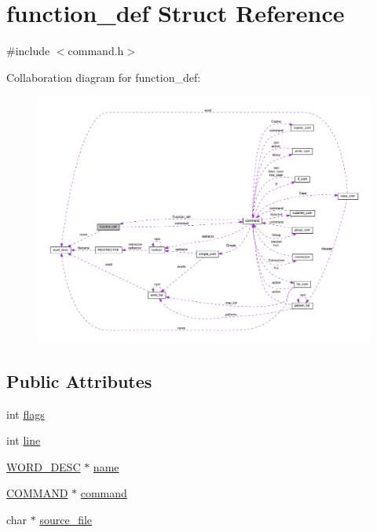 \hypertarget{structfunction__def}{}\section{function\+\_\+def Struct Reference}
\label{structfunction__def}


{\ttfamily \#include $<$command.\+h$>$}



Collaboration diagram for function\+\_\+def\+:
\nopagebreak
\begin{figure}[H]
\begin{center}
\leavevmode
\includegraphics[width=350pt]{structfunction__def__coll__graph}
\end{center}
\end{figure}
\subsection*{Public Attributes}
\begin{DoxyCompactItemize}
\item 
int \hyperlink{structfunction__def_a6301401481265ca9b5282b683b2ba2d4}{flags}
\item 
int \hyperlink{structfunction__def_a522bca5d5ecc615cff04e01de1d19ffc}{line}
\item 
\hyperlink{command_8h_a3f0cccf333703e5f6c4168be0db675fa}{W\+O\+R\+D\+\_\+\+D\+E\+SC} $\ast$ \hyperlink{structfunction__def_a0015166324aa0e5e336c97afcec63059}{name}
\item 
\hyperlink{command_8h_a8c41dec142c299806885773c902c0d87}{C\+O\+M\+M\+A\+ND} $\ast$ \hyperlink{structfunction__def_a1d47a692dd8fb660368206a3218f3fe8}{command}
\item 
char $\ast$ \hyperlink{structfunction__def_ad21801282b94695a306f3864c2bd7376}{source\+\_\+file}
\end{DoxyCompactItemize}



